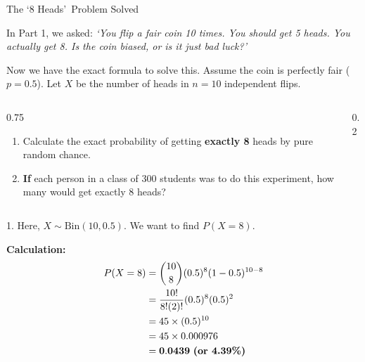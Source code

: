 \begin{frame}[allowframebreaks]{The \lq 8 Heads\rq\ Problem Solved}
    \begin{example}
        In Part 1, we asked: \textit{\lq You flip a fair coin 10 times. You should get 5 heads. You actually get 8. Is the coin biased, or is it just bad luck?\rq}
        
        Now we have the exact formula to solve this. Assume the coin is perfectly fair ($p = 0.5$). Let $X$ be the number of heads in $n=10$ independent flips.
        
        \vspace{0.2cm}
        \begin{columns}[T, onlytextwidth]
            \begin{column}{0.75\textwidth}
                \begin{enumerate}
                    \item Calculate the exact probability of getting \textbf{exactly 8} heads by pure random chance.
                    \item \textbf{If} each person in a class of 300 students was to do this experiment, how many would get exactly 8 heads?
                \end{enumerate}
            \end{column}
            
            \begin{column}{0.2\textwidth}
            \end{column}
        \end{columns}
    \end{example}

    \framebreak

    \begin{solution}
        1. Here, $X \sim \text{Bin}(10, 0.5)$. We want to find $P(X=8)$.
        
        \vspace{0.2cm}
        \textbf{Calculation:}
        \begin{align*}
            P(X=8) &= \binom{10}{8} (0.5)^8 (1 - 0.5)^{10-8} \\
                   &= \frac{10!}{8!(2)!} (0.5)^8 (0.5)^2 \\
                   &= 45 \times (0.5)^{10} \\
                   &= 45 \times 0.000976 \\
                   &= \mathbf{0.0439} \text{ \textbf{(or 4.39\%)}}
        \end{align*}
        

\end{solution}
\end{frame}
